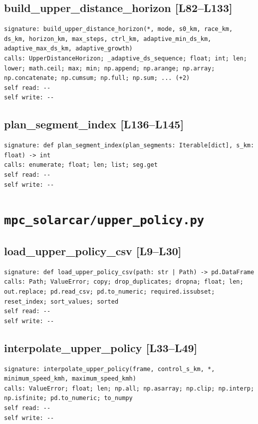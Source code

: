 \documentclass[a4paper,10pt,oneside]{book}
\begin{document}
\subsection*{build\_upper\_distance\_horizon [L82--L133]}
\begin{lstlisting}[numbers=none]
signature: build_upper_distance_horizon(*, mode, s0_km, race_km, ds_km, horizon_km, max_steps, ctrl_km, adaptive_min_ds_km, adaptive_max_ds_km, adaptive_growth)
calls: UpperDistanceHorizon; _adaptive_ds_sequence; float; int; len; lower; math.ceil; max; min; np.append; np.arange; np.array; np.concatenate; np.cumsum; np.full; np.sum; ... (+2)
self read: --
self write: --
\end{lstlisting}
\subsection*{plan\_segment\_index [L136--L145]}
\begin{lstlisting}[numbers=none]
signature: def plan_segment_index(plan_segments: Iterable[dict], s_km: float) -> int
calls: enumerate; float; len; list; seg.get
self read: --
self write: --
\end{lstlisting}
\section{\texttt{mpc\_solarcar/upper\_policy.py}}
\subsection*{load\_upper\_policy\_csv [L9--L30]}
\begin{lstlisting}[numbers=none]
signature: def load_upper_policy_csv(path: str | Path) -> pd.DataFrame
calls: Path; ValueError; copy; drop_duplicates; dropna; float; len; out.replace; pd.read_csv; pd.to_numeric; required.issubset; reset_index; sort_values; sorted
self read: --
self write: --
\end{lstlisting}
\subsection*{interpolate\_upper\_policy [L33--L49]}
\begin{lstlisting}[numbers=none]
signature: interpolate_upper_policy(frame, control_s_km, *, minimum_speed_kmh, maximum_speed_kmh)
calls: ValueError; float; len; np.all; np.asarray; np.clip; np.interp; np.isfinite; pd.to_numeric; to_numpy
self read: --
self write: --
\end{lstlisting}
\end{document}
